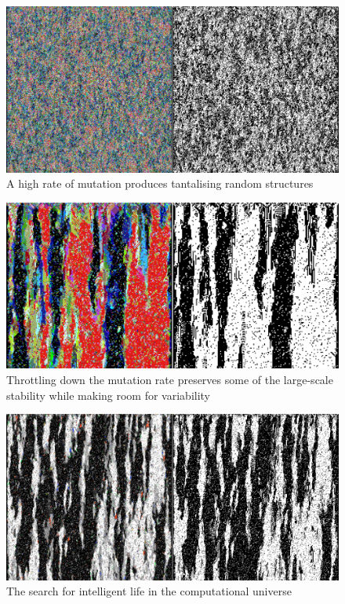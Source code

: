 \documentclass{AISB2008}
\begin{document}
\begin{figure}
\includegraphics[width=\columnwidth]{big.png}
\caption{A high rate of mutation produces tantalising random structures \label{random-mutation}}
\end{figure}

\begin{figure}
\includegraphics[width=\columnwidth]{lamp-down-low.png}
\caption{Throttling down the mutation rate preserves some of the large-scale stability while making room for variability \label{lower-rate}}
\end{figure}

\begin{figure}
\includegraphics[width=\columnwidth]{seti.png}
\caption{The search for intelligent life in the computational universe \label{seti}}
\end{figure}
\end{document}
